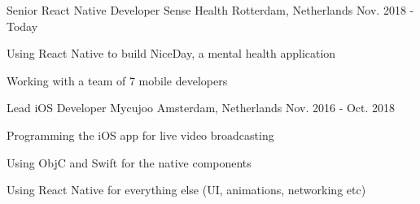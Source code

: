 
\begin{cventries}

  \cventry
    {Senior React Native Developer} %
    {Sense Health} %
    {Rotterdam, Netherlands} %
    {Nov. 2018 - Today} %
    {
      \begin{cvitems} %
        \item {Using React Native to build NiceDay, a mental health application}
        \item {Working with a team of 7 mobile developers}
      \end{cvitems}
    }

  \cventry
    {Lead iOS Developer} %
    {Mycujoo} %
    {Amsterdam, Netherlands} %
    {Nov. 2016 - Oct. 2018} %
    {
      \begin{cvitems} %
        \item {Programming the iOS app for live video broadcasting}
        \item {Using ObjC and Swift for the native components}
        \item {Using React Native for everything else (UI, animations, networking etc)}
      \end{cvitems}
    }


\end{cventries}
